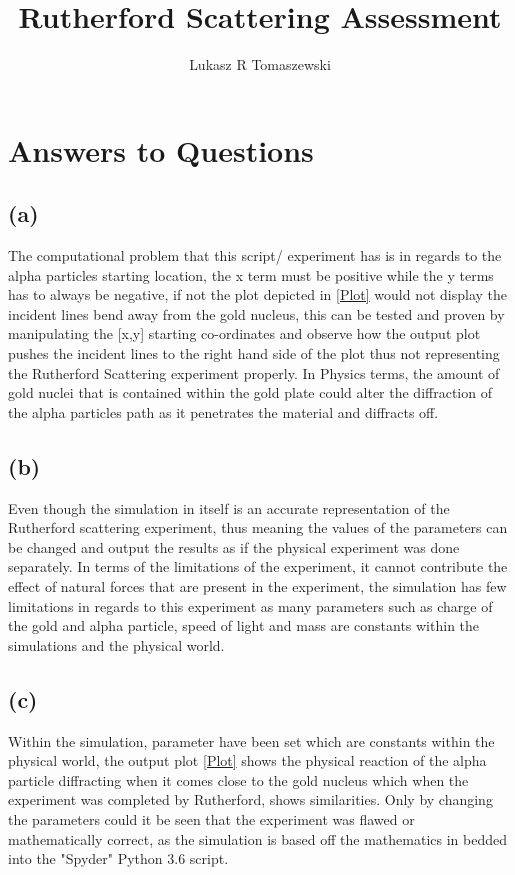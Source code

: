 \documentclass[a4paper,11pt]{article}
\title{Rutherford Scattering Assessment}
\author{Lukasz R Tomaszewski}
\begin{document}
\maketitle

\section{Answers to Questions}

\subsection*{(a)}

The computational problem that this script/ experiment has is in regards to the alpha particles starting location, the x term must be positive while the y terms has to always be negative, if not the plot depicted in \cref{Plot} would not display the incident lines bend away from the gold nucleus, this can be tested and proven by manipulating the [x,y] starting co-ordinates and observe how the output plot pushes the incident lines to the right hand side of the plot thus not representing the Rutherford Scattering experiment properly. In Physics terms, the amount of gold nuclei that is contained within the gold plate could alter the diffraction of the alpha particles path as it penetrates the material and diffracts off. 

\subsection*{(b)}

Even though the simulation in itself is an accurate representation of the Rutherford scattering experiment, thus meaning the values of the parameters can be changed and output the results as if the physical experiment was done separately. In terms of the limitations of the experiment, it cannot contribute the effect of natural forces that are present in the experiment, the simulation has few limitations in regards to this experiment as many parameters such as charge of the gold and alpha particle, speed of light and mass are constants within the simulations and the physical world. 

\subsection*{(c)}

Within the simulation, parameter have been set which are constants within the physical world, the output plot \cref{Plot} shows the physical reaction of the alpha particle diffracting when it comes close to the gold nucleus which when the experiment was completed by Rutherford, shows similarities. Only by changing the parameters could it be seen that the experiment was flawed or mathematically correct, as the simulation is based off the mathematics in bedded into the "Spyder" Python 3.6 script.  
\end{document}
